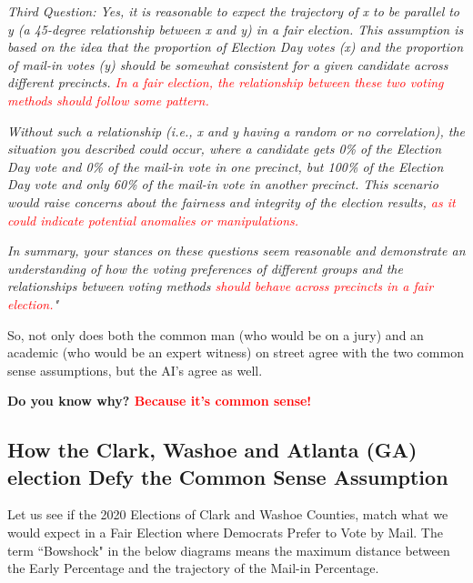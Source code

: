 \documentclass[preprint,13pt]{elsarticle}
\begin{document}
\textit{Third Question:
Yes, it is reasonable to expect the trajectory of x to be parallel to y (a 45-degree relationship between x and y) in a fair election. This assumption is based on the idea that the proportion of Election Day votes (x) and the proportion of mail-in votes (y) should be somewhat consistent for a given candidate across different precincts. \textcolor{red}{In a fair election, the relationship between these two voting methods should follow some pattern.}}

\textit{Without such a relationship (i.e., x and y having a random or no correlation), the situation you described could occur, where a candidate gets 0\% of the Election Day vote and 0\% of the mail-in vote in one precinct, but 100\% of the Election Day vote and only 60\% of the mail-in vote in another precinct. This scenario would raise concerns about the fairness and integrity of the election results, \textcolor{red}{as it could indicate potential anomalies or manipulations.}}

\textit{In summary, your stances on these questions seem reasonable and demonstrate an understanding of how the voting preferences of different groups and the relationships between voting methods \textcolor{red}{should behave across precincts in a fair election.}"}

So, not only does both the common man (who would be on a jury) and an academic (who would be an expert witness) on street agree with the two common sense assumptions, but the AI's agree as well. 

\textbf{Do you know why? \textcolor{red}{Because it's common sense!}}
\newpage
\subsection{How the Clark, Washoe and Atlanta (GA) election Defy the Common Sense Assumption}

Let us see if the 2020 Elections of Clark and Washoe Counties, match what we would expect in a Fair Election where Democrats Prefer to Vote by Mail. The term ``Bowshock" in the below diagrams means the maximum distance between the Early Percentage and the trajectory of the Mail-in Percentage.
\end{document}
